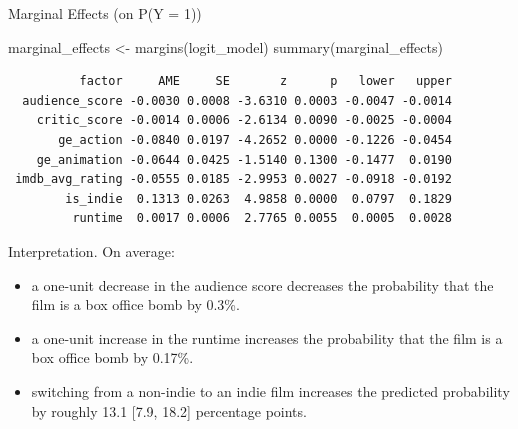 \documentclass[
  10pt,
  ignorenonframetext,
]{beamer}
\newenvironment{Shaded}{\begin{snugshade}}{\end{snugshade}}
\newcommand{\FunctionTok}[1]{\textcolor[rgb]{0.28,0.35,0.67}{#1}}
\newcommand{\NormalTok}[1]{\textcolor[rgb]{0.00,0.23,0.31}{#1}}
\newcommand{\OtherTok}[1]{\textcolor[rgb]{0.00,0.23,0.31}{#1}}
\begin{document}
\begin{frame}[fragile]{Marginal Effects (on P(Y = 1))}
\label{marginal-effects-on-py-1}
\scriptsize

\begin{Shaded}
\begin{Highlighting}[]
\NormalTok{marginal\_effects }\OtherTok{\textless{}{-}} \FunctionTok{margins}\NormalTok{(logit\_model)}
\FunctionTok{summary}\NormalTok{(marginal\_effects)}
\end{Highlighting}
\end{Shaded}

\begin{verbatim}
          factor     AME     SE       z      p   lower   upper
  audience_score -0.0030 0.0008 -3.6310 0.0003 -0.0047 -0.0014
    critic_score -0.0014 0.0006 -2.6134 0.0090 -0.0025 -0.0004
       ge_action -0.0840 0.0197 -4.2652 0.0000 -0.1226 -0.0454
    ge_animation -0.0644 0.0425 -1.5140 0.1300 -0.1477  0.0190
 imdb_avg_rating -0.0555 0.0185 -2.9953 0.0027 -0.0918 -0.0192
        is_indie  0.1313 0.0263  4.9858 0.0000  0.0797  0.1829
         runtime  0.0017 0.0006  2.7765 0.0055  0.0005  0.0028
\end{verbatim}

Interpretation. On average:

\begin{itemize}
\item
  a one-unit decrease in the audience score decreases the probability
  that the film is a box office bomb by 0.3\%.
\item
  a one-unit increase in the runtime increases the probability that the
  film is a box office bomb by 0.17\%.
\item
  switching from a non-indie to an indie film increases the predicted
  probability by roughly 13.1 {[}7.9, 18.2{]} percentage points.
\end{itemize}
\end{frame}
\end{document}
